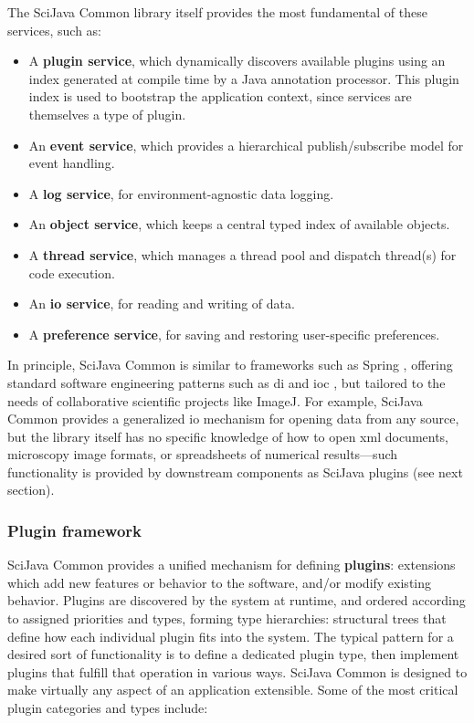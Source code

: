 \documentclass{bmcart}
\begin{document}
The SciJava Common library itself provides the most fundamental of these
services, such as:

\begin{itemize}
  \item A \textbf{plugin service}, which dynamically discovers available
    plugins using an index generated at compile time by a Java annotation
    processor. This plugin index is used to bootstrap the application context,
    since services are themselves a type of plugin.
  \item An \textbf{event service}, which provides a hierarchical
    publish/subscribe model for event handling.
  \item A \textbf{log service}, for environment-agnostic data logging.
  \item An \textbf{object service}, which keeps a central typed index of
    available objects.
  \item A \textbf{thread service}, which manages a thread pool and dispatch
    thread(s) for code execution.
  \item An \textbf{\acrfull{io} service}, for reading and writing of data.
  \item A \textbf{preference service}, for saving and restoring user-specific
    preferences.
\end{itemize}

In principle, SciJava Common is similar to frameworks such as Spring
\cite{spring}, offering standard software engineering patterns such as
\acrfull{di} \cite{dependency_injection} and \acrfull{ioc} \cite{ioc}, but
tailored to the needs of collaborative scientific projects like ImageJ. For
example, SciJava Common provides a generalized \acrshort{io} mechanism for
opening data from any source, but the library itself has no specific knowledge
of how to open \acrfull{xml} documents, microscopy image formats, or
spreadsheets of numerical results---such functionality is provided by
downstream components as SciJava plugins (see next section).

\subsubsection*{Plugin framework}
SciJava Common provides a unified mechanism for defining \textbf{plugins}:
extensions which add new features or behavior to the software, and/or modify
existing behavior. Plugins are discovered by the system at runtime, and ordered
according to assigned priorities and types, forming type hierarchies:
structural trees that define how each individual plugin fits into the system.
The typical pattern for a desired sort of functionality is to define a
dedicated plugin type, then implement plugins that fulfill that operation in
various ways. SciJava Common is designed to make virtually any aspect of an
application extensible. Some of the most critical plugin categories and types
include:
\end{document}
